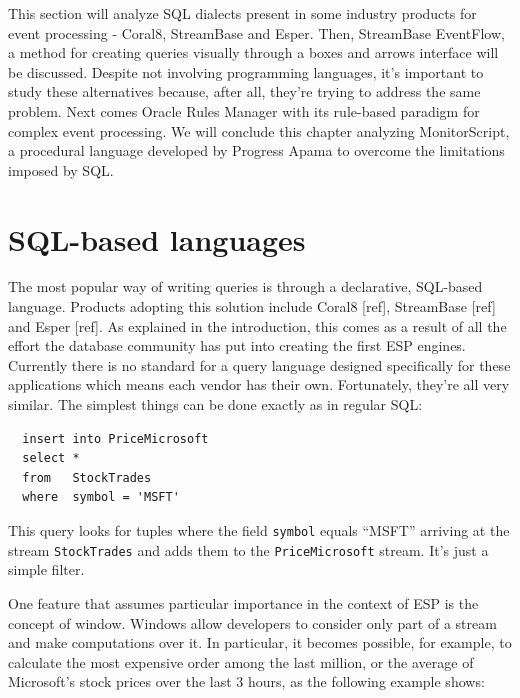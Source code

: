 \documentclass{report}
\begin{document}
This section will analyze SQL dialects present in some industry
products for event processing - Coral8, StreamBase and Esper. Then,
StreamBase EventFlow, a method for creating queries visually through a
boxes and arrows interface will be discussed. Despite not involving
programming languages, it's important to study these alternatives
because, after all, they're trying to address the same problem. Next
comes Oracle Rules Manager with its rule-based paradigm for complex
event processing. We will conclude this chapter analyzing
MonitorScript, a procedural language developed by Progress Apama to
overcome the limitations imposed by SQL.

\section{SQL-based languages}
\label{sec:sql}

The most popular way of writing queries is through a declarative,
SQL-based language. Products adopting this solution include Coral8
[ref], StreamBase [ref] and Esper [ref]. As explained in the
introduction, this comes as a result of all the effort the database
community has put into creating the first ESP engines. Currently there
is no standard for a query language designed specifically for these
applications which means each vendor has their own. Fortunately,
they're all very similar. The simplest things can be done exactly as
in regular SQL:

\lstset{
  language=CCL,
  columns=fullflexible,
  basicstyle=\tt,
  keywordstyle=[1]\bf,
  keywordstyle=[2]\it,
}

\begin{lstlisting}
  insert into PriceMicrosoft
  select *
  from   StockTrades
  where  symbol = 'MSFT'
\end{lstlisting}


This query looks for tuples where the field \verb=symbol= equals
``MSFT'' arriving at the stream \verb=StockTrades= and adds them to
the \verb=PriceMicrosoft= stream. It's just a simple filter.

One feature that assumes particular importance in the context of ESP
is the concept of window. Windows allow developers to consider only
part of a stream and make computations over it. In particular, it
becomes possible, for example, to calculate the most expensive order
among the last million, or the average of Microsoft's stock prices
over the last 3 hours, as the following example shows:
\end{document}
